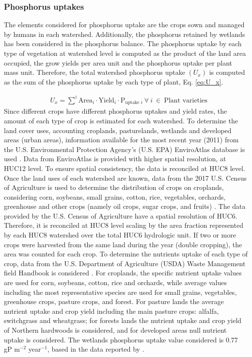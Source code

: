 \documentclass[10pt,a4paper]{article}
\begin{document}
\subsubsection{Phosphorus uptakes}
The elements considered for phosphorus uptake are the crops sown and managed by humans in each watershed. Additionally, the phosphorus retained by wetlands has been considered in the phosphorus balance. The phosphorus uptake by each type of vegetation at watershed level is computed as the product of the land area occupied, the grow yields per area unit and the phosphorus uptake per plant mass unit. Therefore, the total watershed phosphorus uptake $\left(U_{x}\right)$ is computed as the sum of the phosphorus uptake by each type of plant, Eq. \ref{eq:U_x}.
	
\begin{align}
	& U_{x} = \sum^{i} \text{Area}_{i} \cdot \text{Yield}_{i} \cdot \text{P}_{\text{uptake }i} \ \forall \ i \ \in \ {\text{Plant varieties}} \label{eq:U_x}
\end{align}
Since different crops have different phosphorus uptakes and yield rates, the amount of each type of crop is estimated for each watershed. To determine the land cover uses, accounting croplands, pasturelands, wetlands and developed areas (urban areas), information available for the most recent year (2011) from the U.S. Environmental Protection Agency's (U.S. EPA) EnviroAtlas database is used . Data from EnviroAtlas is provided with higher spatial resolution, at HUC12 level. To ensure spatial consistency, the data is reconciled at HUC8 level. Once the land uses of each watershed are known, data from the 2017 U.S. Census of Agriculture is used to determine the distribution of crops on croplands, considering corn, soybeans, small grains, cotton, rice, vegetables, orchards, greenhouse and other crops (namely oil crops, sugar crops, and fruits) . The data provided by the U.S. Census of Agriculture have a spatial resolution of HUC6. Therefore, it is reconciled at HUC8 level scaling by the area fraction represented by each HUC8 watershed over the total HUC6 hydrologic unit. If two or more crops were harvested from the same land during the year (double cropping), the area was counted for each crop. To determine the nutrients uptake of each type of crop, data from the U.S. Department of Agriculture (USDA) Waste Management field Handbook is considered  . For croplands, the specific nutrient uptake values are used for corn, soybeans, cotton, rice and orchards, while average values including the most representative species are used for small grains, vegetables, greenhouse crops, pasture crops, and forest. For pasture lands the average nutrient uptake and crop yield including the main pasture crops: alfalfa, switchgrass and wheatgrass; for forests lands the nutrient uptake and crop yield of Northern hardwoods is considered, and for developed areas null nutrient uptake is considered. The wetlands phosphorus uptake value considered is 0.77 gP m$^{-2}$ year$^{-1}$, based in the data reported by .
\end{document}
